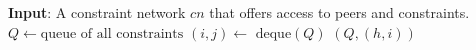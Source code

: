 \State \textbf{Input}: A constraint network $cn$ that offers access to peers and constraints.\\
    \State $Q \gets \text{queue of all constraints}$
        \State $(i,j) \gets \text{ deque}(Q)$
                    \State {}$(Q, (h, i))$
                \EndIf
            \EndFor
        \EndIf
    \EndWhile\label{euclidendwhile}
\EndFunction